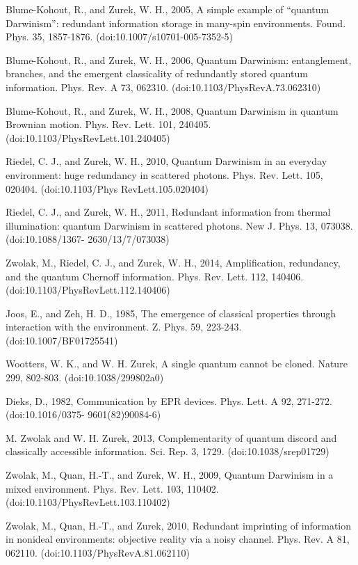 \documentclass[aps,amsmath,amssymb,amsfonts,12pt]{revtex4-1}
\newcommand{\+}         {\dagger}
\begin{document}
{{{\begin{references}
 Blume-Kohout, R., and Zurek, W. H., 2005, A simple example of ``quantum Darwinism'':
redundant information storage in many-spin environments. Found. Phys. 35, 1857-1876.
(doi:10.1007/s10701-005-7352-5)

 Blume-Kohout, R., and Zurek, W. H., 2006, Quantum Darwinism: entanglement, branches, and the
emergent classicality of redundantly stored quantum information. Phys. Rev. A 73, 062310.
(doi:10.1103/PhysRevA.73.062310)

 Blume-Kohout, R., and Zurek, W. H., 2008, Quantum Darwinism in quantum Brownian motion. Phys. Rev. Lett. 101, 240405. (doi:10.1103/PhysRevLett.101.240405)

 Riedel, C. J., and Zurek, W. H., 2010, Quantum Darwinism in an everyday environment:
huge redundancy in scattered photons. Phys. Rev. Lett. 105, 020404. (doi:10.1103/Phys
RevLett.105.020404)

 Riedel, C. J., and Zurek, W. H., 2011, Redundant information from thermal illumination:
quantum Darwinism in scattered photons. New J. Phys. 13, 073038. (doi:10.1088/1367-
2630/13/7/073038)

 Zwolak, M., Riedel, C. J., and Zurek, W. H., 2014, Amplification, redundancy, and the quantum Chernoff
information. Phys. Rev. Lett. 112, 140406. (doi:10.1103/PhysRevLett.112.140406)

 Joos, E., and Zeh, H. D., 1985, The emergence of classical properties through interaction with the
environment. Z. Phys. 59, 223-243. (doi:10.1007/BF01725541)

 Wootters, W. K., and W. H. Zurek, A single quantum cannot be cloned. Nature 299, 802-803.
(doi:10.1038/299802a0)

 Dieks, D., 1982, Communication by EPR devices. Phys. Lett. A 92, 271-272. (doi:10.1016/0375-
9601(82)90084-6)

 M. Zwolak and W. H. Zurek, 2013, Complementarity of quantum discord and classically accessible
information. Sci. Rep. 3, 1729. (doi:10.1038/srep01729)

 Zwolak, M., Quan, H.-T., and Zurek, W. H., 2009, Quantum Darwinism in a mixed environment. Phys.
Rev. Lett. 103, 110402. (doi:10.1103/PhysRevLett.103.110402)

 Zwolak, M., Quan, H.-T., and Zurek, 2010, Redundant imprinting of information in
nonideal environments: objective reality via a noisy channel. Phys. Rev. A 81, 062110.
(doi:10.1103/PhysRevA.81.062110)


\end{references}}}}
\end{document}
